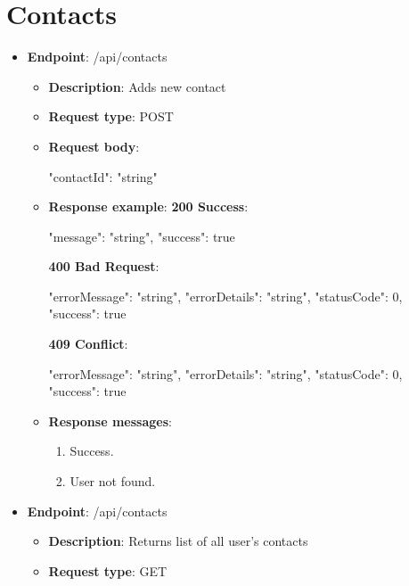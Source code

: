\section{Contacts}\label{sec:contacts}
\begin{itemize}
    \item \textbf{Endpoint}: /api/contacts
    \begin{itemize}
        \item \textbf{Description}: Adds new contact
        \item \textbf{Request type}: POST
        \item \textbf{Request body}:
        \begin{spverbatim}
        {
            "contactId": "string"
        }
        \end{spverbatim}
        \item \textbf{Response example}:
        \textbf{200 Success}:
        \begin{spverbatim}
        {
            "message": "string",
            "success": true
        }
        \end{spverbatim}
        \textbf{400 Bad Request}:
        \begin{spverbatim}
        {
            "errorMessage": "string",
            "errorDetails": "string",
            "statusCode": 0,
            "success": true
        }
        \end{spverbatim}
        \textbf{409 Conflict}:
        \begin{spverbatim}
        {
            "errorMessage": "string",
            "errorDetails": "string",
            "statusCode": 0,
            "success": true
        }
        \end{spverbatim}
        \item \textbf{Response messages}:
        \begin{enumerate}
            \item Success.
            \item User not found.
        \end{enumerate}
    \end{itemize}
    \item \textbf{Endpoint}: /api/contacts
    \begin{itemize}
        \item \textbf{Description}: Returns list of all user's contacts
        \item \textbf{Request type}: GET

\end{itemize}
\end{itemize}
